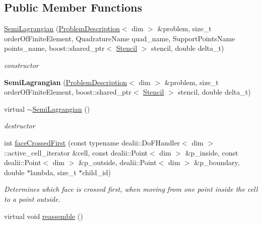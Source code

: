 \subsection*{Public Member Functions}
\begin{DoxyCompactItemize}
\item 
\hyperlink{classnatrium_1_1SemiLagrangian_a6875a404457277b3e1f7853768837b3f}{SemiLagrangian} (\hyperlink{classnatrium_1_1ProblemDescription}{ProblemDescription}$<$ dim $>$ \&problem, size\_\-t orderOfFiniteElement, QuadratureName quad\_\-name, SupportPointsName points\_\-name, boost::shared\_\-ptr$<$ \hyperlink{classnatrium_1_1Stencil}{Stencil} $>$ stencil, double delta\_\-t)
\begin{DoxyCompactList}\small\item\em constructor \item\end{DoxyCompactList}\item 
\hypertarget{classnatrium_1_1SemiLagrangian_a4b94451652c87b98a140ddcec7f21033}{
{\bfseries SemiLagrangian} (\hyperlink{classnatrium_1_1ProblemDescription}{ProblemDescription}$<$ dim $>$ \&problem, size\_\-t orderOfFiniteElement, boost::shared\_\-ptr$<$ \hyperlink{classnatrium_1_1Stencil}{Stencil} $>$ stencil, double delta\_\-t)}
\label{classnatrium_1_1SemiLagrangian_a4b94451652c87b98a140ddcec7f21033}

\item 
\hypertarget{classnatrium_1_1SemiLagrangian_a6c0ebcd2055e6608cc6f280a89ea43a3}{
virtual \hyperlink{classnatrium_1_1SemiLagrangian_a6c0ebcd2055e6608cc6f280a89ea43a3}{$\sim$SemiLagrangian} ()}
\label{classnatrium_1_1SemiLagrangian_a6c0ebcd2055e6608cc6f280a89ea43a3}

\begin{DoxyCompactList}\small\item\em destructor \item\end{DoxyCompactList}\item 
int \hyperlink{classnatrium_1_1SemiLagrangian_a3b096afb85f7ea3782e03ba36b973088}{faceCrossedFirst} (const typename dealii::DoFHandler$<$ dim $>$::active\_\-cell\_\-iterator \&cell, const dealii::Point$<$ dim $>$ \&p\_\-inside, const dealii::Point$<$ dim $>$ \&p\_\-outside, dealii::Point$<$ dim $>$ \&p\_\-boundary, double $\ast$lambda, size\_\-t $\ast$child\_\-id)
\begin{DoxyCompactList}\small\item\em Determines which face is crossed first, when moving from one point inside the cell to a point outside. \item\end{DoxyCompactList}\item 
\hypertarget{classnatrium_1_1SemiLagrangian_a7f08b1181db3c1d1f26ba0cac9210fbc}{
virtual void \hyperlink{classnatrium_1_1SemiLagrangian_a7f08b1181db3c1d1f26ba0cac9210fbc}{reassemble} ()}
\label{classnatrium_1_1SemiLagrangian_a7f08b1181db3c1d1f26ba0cac9210fbc}


\end{DoxyCompactItemize}
